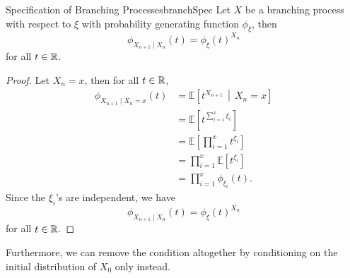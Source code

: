 \documentclass[math, code]{amznotes}
\theoremstyle{remark}
\begin{document}
\begin{probox}{Specification of Branching Processes}{branchSpec}
    Let $X$ be a branching process with respect to $\xi$ with probability generating function $\phi_{\xi}$, then
    \begin{equation*}
        \phi_{X_{n + 1} \mid X_n}\left(t\right) = \phi_{\xi}\left(t\right)^{X_n}
    \end{equation*}
    for all $t \in \mathbb{R}$.
    \tcblower
    \begin{proof}
        Let $X_n = x$, then for all $t \in \mathbb{R}$,
        \begin{align*}
            \phi_{X_{n + 1} \mid X_n = x}\left(t\right) & = \mathbb{E}\left[t^{X_{n + 1}} \,\middle\vert\, X_n = x\right] \\
            & = \mathbb{E}\left[t^{\sum_{i = 1}^{x}\xi_i}\right] \\
            & = \mathbb{E}\left[\prod_{i = 1}^{x}t^{\xi_i}\right] \\
            & = \prod_{i = 1}^{x}\mathbb{E}\left[t^{\xi_i}\right] \\
            & = \prod_{i = 1}^{x}\phi_{\xi_i}\left(t\right).
        \end{align*}
        Since the $\xi_i$'s are independent, we have 
        \begin{equation*}
            \phi_{X_{n + 1} \mid X_n}\left(t\right) = \phi_{\xi}\left(t\right)^{X_n}
        \end{equation*}
        for all $t \in \mathbb{R}$.
    \end{proof}
\end{probox}
Furthermore, we can remove the condition altogether by conditioning on the initial distribution of $X_0$ only instead.
\end{document}
